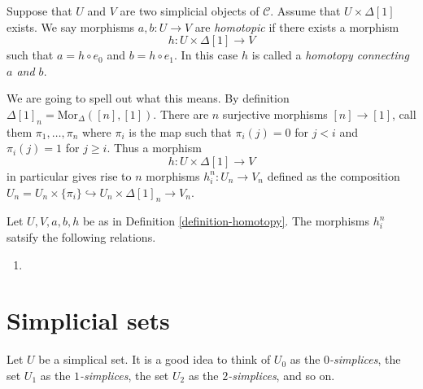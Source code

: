 \begin{definition}
\label{definition-homotopy}
Suppose that $U$ and $V$ are two simplicial objects
of $\mathcal{C}$. Assume that $U \times \Delta[1]$ exists.
We say morphisms $a, b : U \to V$ are {\it homotopic}
if there exists a morphism
$$
h : U \times \Delta[1] \longrightarrow V
$$
such that $a = h \circ e_0$ and $b = h \circ e_1$.
In this case $h$ is called a {\it homotopy connecting
$a$ and $b$}.
\end{definition}

\noindent
We are going to spell out what this means.
By definition $\Delta[1]_n = \text{Mor}_{\Delta}([n], [1])$.
There are $n$ surjective morphisms $[n] \to [1]$, call
them $\pi_1, \ldots, \pi_n$ where $\pi_i$ is the map such that
$\pi_i(j) = 0$ for $j < i$ and $\pi_i(j) = 1$ for $j \geq i$.
Thus a morphism
$$
h : U \times \Delta[1] \longrightarrow V
$$
in particular gives rise to $n$ morphisms $h^n_i : U_n \to V_n$
defined as the composition
$U_n = U_n \times \{\pi_i\} \hookrightarrow U_n \times \Delta[1]_n
\to V_n$.

\begin{lemma}
\label{lemma-relations-homotopy}
Let $U, V, a, b, h$ be as in Definition \ref{definition-homotopy}.
The morphisms $h^n_i$ satsify the following relations.
\begin{enumerate}
\item 
\end{enumerate}
\end{lemma}





























\section{Simplicial sets}
\label{section-simplicial-set}

\noindent
Let $U$ be a simplical set. It is a good idea to think of
$U_0$ as the {\it $0$-simplices}, the set $U_1$ as the
{\it $1$-simplices},
the set $U_2$ as the {\it $2$-simplices}, and so on.

